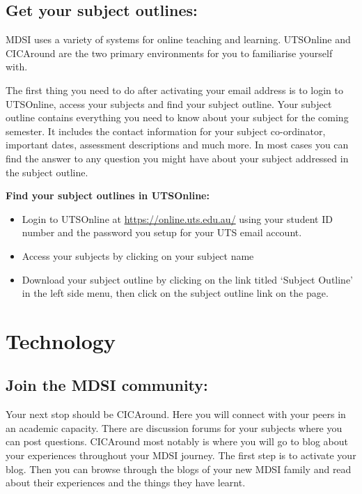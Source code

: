 \documentclass[]{book}
\providecommand{\tightlist}{%
  \setlength{\itemsep}{0pt}\setlength{\parskip}{0pt}}
\theoremstyle{definition}
\theoremstyle{definition}
\theoremstyle{remark}
\begin{document}
\subsection{Get your subject outlines:}\label{get-your-subject-outlines}

MDSI uses a variety of systems for online teaching and learning.
UTSOnline and CICAround are the two primary environments for you to
familiarise yourself with.

The first thing you need to do after activating your email address is to
login to UTSOnline, access your subjects and find your subject outline.
Your subject outline contains everything you need to know about your
subject for the coming semester. It includes the contact information for
your subject co-ordinator, important dates, assessment descriptions and
much more. In most cases you can find the answer to any question you
might have about your subject addressed in the subject outline.

\textbf{Find your subject outlines in UTSOnline:}

\begin{itemize}
\tightlist
\item
  Login to UTSOnline at \url{https://online.uts.edu.au/} using your
  student ID number and the password you setup for your UTS email
  account.
\item
  Access your subjects by clicking on your subject name
\item
  Download your subject outline by clicking on the link titled `Subject
  Outline' in the left side menu, then click on the subject outline link
  on the page.
\end{itemize}

\section{Technology}\label{technology}

\subsection{Join the MDSI community:}\label{join-the-mdsi-community}

Your next stop should be CICAround. Here you will connect with your
peers in an academic capacity. There are discussion forums for your
subjects where you can post questions. CICAround most notably is where
you will go to blog about your experiences throughout your MDSI journey.
The first step is to activate your blog. Then you can browse through the
blogs of your new MDSI family and read about their experiences and the
things they have learnt.
\end{document}
